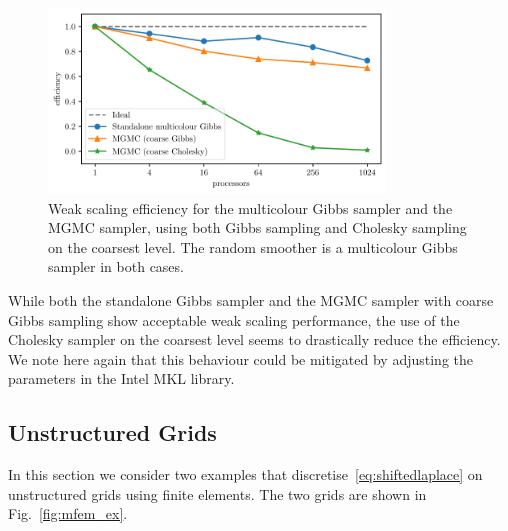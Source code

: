 \documentclass[
fontsize=11pt,
paper=a4,
numbers=noenddot
]{scrartcl}
\begin{document}
\begin{figure}[htbp]
    \centering
    \includegraphics[width=0.8\textwidth]{plots/weak_scaling_64x64.pdf}
    \caption{Weak scaling efficiency for the multicolour Gibbs sampler and the MGMC sampler, using both Gibbs sampling and Cholesky sampling on the coarsest level. The random smoother is a multicolour Gibbs sampler in both cases.}
    \label{fig:2d_structured_ws}
\end{figure}

While both the standalone Gibbs sampler and the MGMC sampler with coarse Gibbs sampling show acceptable weak scaling performance, the use of the Cholesky sampler on the coarsest level seems to drastically reduce the efficiency. We note here again that this behaviour could be mitigated by adjusting the parameters in the Intel MKL library.

\subsection{Unstructured Grids}
In this section we consider two examples that discretise~\eqref{eq:shiftedlaplace} on unstructured grids using finite elements. The two grids are shown in Fig.~\ref{fig:mfem_ex}.
\end{document}
